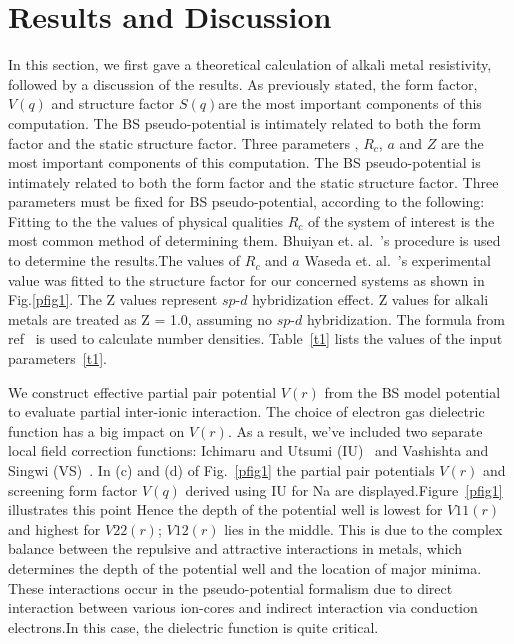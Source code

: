 \documentclass[final,12pt]{elsarticle}
\begin{document}
\section{Results and Discussion}
\label{res}
In this section, we first gave a theoretical calculation of alkali metal resistivity, followed by a discussion of the results.
As previously stated, the form factor,$V(q)$ and structure factor $S(q)$are the most important components of this computation.
The BS pseudo-potential is intimately related to both the form factor and the static structure factor.
Three parameters , $R_c$, $a$ and $Z$ are the most important components of this computation.
The BS pseudo-potential is intimately related to both the form factor and the static structure factor.
Three parameters must be fixed for BS pseudo-potential, according to the following:
Fitting to the the values of physical qualities $R_c$  of the system of interest is the most common method of determining them.
 Bhuiyan et. al.~\cite{Bhuiyan1993}'s  procedure is used to determine the results.The values of $R_c$ and $a$ Waseda et. al.~\cite{Waseda}'s experimental value was fitted to the structure factor for our concerned systems as shown in Fig.\ref{pfig1}. The Z values represent $sp$-$d$ hybridization effect. Z values for alkali metals are treated as Z = 1.0, assuming no $sp$-$d$ hybridization. The formula from ref~\cite{Smithells} is used to calculate number densities. Table~\ref{t1} lists the values of the input parameters~\ref{t1}. 

We construct effective partial pair potential $V(r)$ from the BS model potential to evaluate partial inter-ionic interaction.
The choice of electron gas dielectric function has a big impact on $V(r)$.  As a result, we've included two separate local field correction functions:  Ichimaru and Utsumi (IU)~\cite{ichimaru} and Vashishta and Singwi (VS)~\cite{Vashishta1972}. In (c) and (d) of Fig.~\ref{pfig1} the partial pair potentials $V(r)$ and screening form factor $V(q)$ derived using IU for Na are displayed.Figure~\ref{pfig1} illustrates this point Hence the depth of the potential well is lowest for $V 11(r)$ and highest for $V 22(r)$; $V 12(r)$ lies in the middle.
This is due to the complex balance between the repulsive and attractive interactions in metals, which determines the depth of the potential well and the location of major minima.
These interactions occur in the pseudo-potential formalism due to direct interaction between various ion-cores and indirect interaction via conduction electrons.In this case, the dielectric function is quite critical.  
\end{document}
